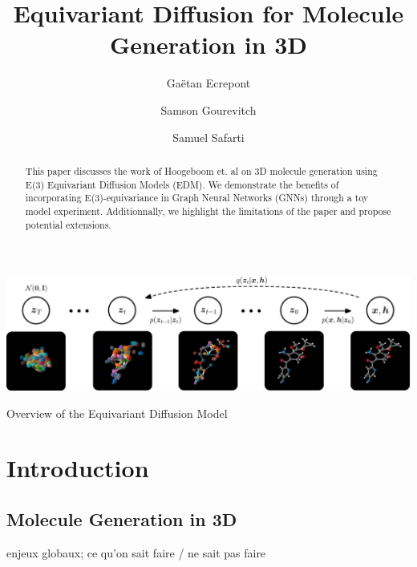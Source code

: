 \documentclass[sigconf]{acmart}
\begin{document}
\title{Equivariant Diffusion for Molecule Generation in 3D}

\author{Gaëtan Ecrepont}

\author{Samson Gourevitch}

\author{Samuel Safarti}

\begin{abstract}
This paper discusses the work of Hoogeboom et. al \cite{edm} on 3D molecule generation using E(3) Equivariant Diffusion Models (EDM). We demonstrate the benefits of incorporating E(3)-equivariance in Graph Neural Networks (GNNs) through a toy model experiment. Additionnally, we highlight the limitations of the paper and propose potential extensions.
\end{abstract}




\begin{teaserfigure}
  \includegraphics[width=\textwidth]{figures/overview_diffusion.pdf}
  \caption{Overview of the Equivariant Diffusion Model}
  \label{fig:teaser}
\end{teaserfigure}


\maketitle

\section{Introduction} %
\subsection{Molecule Generation in 3D}
enjeux globaux; ce qu'on sait faire / ne sait pas faire
\end{document}
